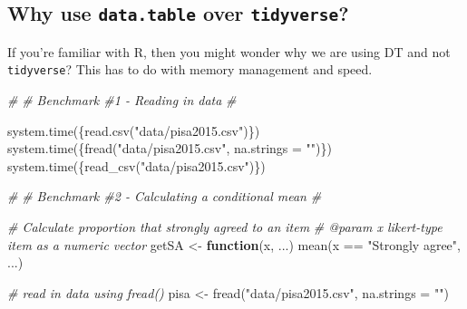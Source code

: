 \documentclass[
]{book}
\newenvironment{Shaded}{\begin{snugshade}}{\end{snugshade}}
\newcommand{\AttributeTok}[1]{\textcolor[rgb]{0.77,0.63,0.00}{#1}}
\newcommand{\CommentTok}[1]{\textcolor[rgb]{0.56,0.35,0.01}{\textit{#1}}}
\newcommand{\ControlFlowTok}[1]{\textcolor[rgb]{0.13,0.29,0.53}{\textbf{#1}}}
\newcommand{\FunctionTok}[1]{\textcolor[rgb]{0.00,0.00,0.00}{#1}}
\newcommand{\NormalTok}[1]{#1}
\newcommand{\OtherTok}[1]{\textcolor[rgb]{0.56,0.35,0.01}{#1}}
\newcommand{\SpecialCharTok}[1]{\textcolor[rgb]{0.00,0.00,0.00}{#1}}
\newcommand{\StringTok}[1]{\textcolor[rgb]{0.31,0.60,0.02}{#1}}
\begin{document}
\hypertarget{why-use-data.table-over-tidyverse}{%
\subsection{\texorpdfstring{Why use \texttt{data.table} over \texttt{tidyverse}?}{Why use data.table over tidyverse?}}\label{why-use-data.table-over-tidyverse}}

If you're familiar with R, then you might wonder why we are using DT and not \texttt{tidyverse}? This has to do with memory management and speed.

\begin{Shaded}
\begin{Highlighting}[]
\CommentTok{\#}
\CommentTok{\# Benchmark \#1 {-} Reading in data}
\CommentTok{\#}

\FunctionTok{system.time}\NormalTok{(\{}\FunctionTok{read.csv}\NormalTok{(}\StringTok{"data/pisa2015.csv"}\NormalTok{)\})}
\FunctionTok{system.time}\NormalTok{(\{}\FunctionTok{fread}\NormalTok{(}\StringTok{"data/pisa2015.csv"}\NormalTok{, }\AttributeTok{na.strings =} \StringTok{""}\NormalTok{)\})}
\FunctionTok{system.time}\NormalTok{(\{}\FunctionTok{read\_csv}\NormalTok{(}\StringTok{"data/pisa2015.csv"}\NormalTok{)\})}

\CommentTok{\#}
\CommentTok{\# Benchmark \#2 {-} Calculating a conditional mean}
\CommentTok{\#}

\CommentTok{\#\textquotesingle{} Calculate proportion that strongly agreed to an item}
\CommentTok{\#\textquotesingle{} @param x likert{-}type item as a numeric vector}
\NormalTok{getSA }\OtherTok{\textless{}{-}} \ControlFlowTok{function}\NormalTok{(x, ...) }\FunctionTok{mean}\NormalTok{(x }\SpecialCharTok{==} \StringTok{"Strongly agree"}\NormalTok{, ...)}

\CommentTok{\# read in data using fread()}
\NormalTok{pisa }\OtherTok{\textless{}{-}} \FunctionTok{fread}\NormalTok{(}\StringTok{"data/pisa2015.csv"}\NormalTok{, }\AttributeTok{na.strings =} \StringTok{""}\NormalTok{)}


\end{Highlighting}
\end{Shaded}
\end{document}
